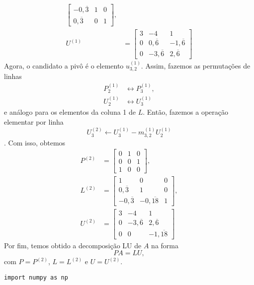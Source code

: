 \begin{ex}
\begin{align}
\begin{bmatrix}
      -0,\overline{3} & 1 & 0\\
      0,\overline{3} & 0 & 1      
    \end{bmatrix},\\
    U^{(1)} &= 
    \begin{bmatrix}
      3 & -4 & 1\\
      0 & 0,\overline{6} & -1,\overline{6}\\
      0 & -3,\overline{6} & 2,\overline{6}
    \end{bmatrix}
  \end{align}
  Agora, o candidato a pivô é o elemento $u^{(1)}_{3,2}$. Assim, fazemos as permutações de linhas
  \begin{align}
    P^{(1)}_2 &\leftrightarrow P^{(1)}_3, \\
    U^{(1)}_2 &\leftrightarrow U^{(1)}_3
  \end{align}
  e análogo para os elementos da coluna 1 de $L$. Então, fazemos a operação elementar por linha
  \begin{equation}
    U^{(2)}_3 \leftarrow U^{(1)}_3 - m^{(1)}_{3,2}U^{(1)}_2
  \end{equation}
. Com isso, obtemos
  \begin{align}
    P^{(2)} &=
    \begin{bmatrix}
      0 & 1 & 0\\
      0 & 0 & 1\\
      1 & 0 & 0
    \end{bmatrix},\\
    L^{(2)} &=
    \begin{bmatrix}
      1 & 0 & 0\\
      0,\overline{3} & 1 & 0\\
      -0,\overline{3} & -0,\overline{18} & 1      
    \end{bmatrix},\\
    U^{(2)} &= 
    \begin{bmatrix}
      3 & -4 & 1\\
      0 & -3,\overline{6} & 2,\overline{6}\\
      0 & 0 & -1,\overline{18}
    \end{bmatrix}
  \end{align}
  Por fim, temos obtido a decomposição LU de $A$ na forma
  \begin{equation}
    PA = LU,
  \end{equation}
  com $P=P^{(2)}$, $L=L^{(2)}$ e $U=U^{(2)}$.

\begin{lstlisting}[caption=lup.py, label=cap_sislin_sec_lu:cod:lup]
import numpy as np


\end{lstlisting}
\end{ex}
